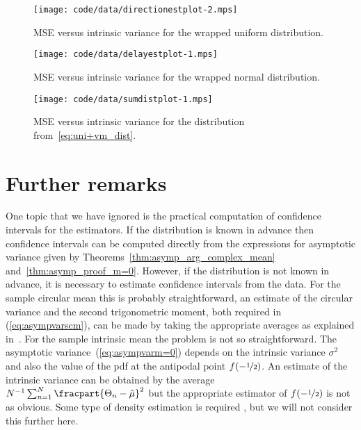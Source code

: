 \documentclass[journal]{IEEEtran}
\begin{document}
\begin{figure}[p]
	\centering
		\texttt{[image: code/data/directionestplot-2.mps]}
		\caption{MSE versus intrinsic variance for the wrapped uniform distribution.}
		\label{fig:directionest_Uniform}
\end{figure}

\begin{figure}[p]
	\centering
		\texttt{[image: code/data/delayestplot-1.mps]}
		\caption{MSE versus intrinsic variance for the wrapped normal distribution.}
		\label{fig:directionest_normal}
\end{figure}

\begin{figure}[p]
	\centering
		\texttt{[image: code/data/sumdistplot-1.mps]}
		\caption{MSE versus intrinsic variance for the distribution from~\eqref{eq:uni+vm_dist}.}
		\label{fig:directionest_sumdist}
\end{figure}



\section{Further remarks}

One topic that we have ignored is the practical computation of confidence intervals for the estimators.  If the distribution is known in advance then confidence intervals can be computed directly from the expressions for asymptotic variance given by Theorems~\ref{thm:asymp_arg_complex_mean} and~\ref{thm:asymp_proof_m=0}.  However, if the distribution is not known in advance, it is necessary to estimate confidence intervals from the data.  For the sample circular mean this is probably straightforward, an estimate of the circular variance and the second trigonometric moment, both required in (\ref{eq:asympvarscm}), can be made by taking the appropriate averages as explained in~\cite{Fisher_common_mean_direction_dir_est_no_dist_assumptions1983}. For the sample intrinsic mean the problem is not so straightforward. The asymptotic variance~(\ref{eq:asympvarm=0}) depends on the intrinsic variance $\sigma^2$ and also the value of the pdf at the antipodal point $f(-\nicefrac{1}{2})$. An estimate of the intrinsic variance can be obtained by the average $N^{-1}\sum_{n=1}^{N}\fracpart{\Theta_n - \hat{\mu}}^2$ but the appropriate estimator of $f(-\nicefrac{1}{2})$ is not as obvious. Some type of density estimation is required \cite{Fisher1989smoothingcircdata,Rosenblatt_dens_est_1956,Parzen_dens_est_1962}, but we will not consider this further here. 
\end{document}
